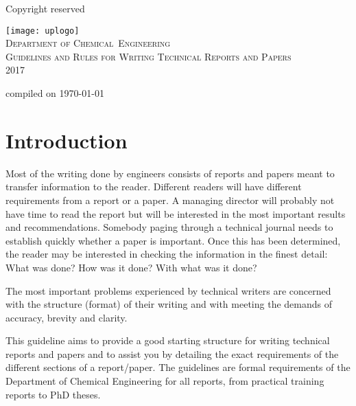 \documentclass[a5paper, 10pt]{article}
\begin{document}
\begin{titlepage}
  \begin{centering}
    \begin{flushright}Copyright reserved\end{flushright}
    \vfil
    \texttt{[image: uplogo]}\\
    \vfil
    {\Huge\scshape
    Department of Chemical~Engineering\\
    \vfil
    Guidelines and Rules for Writing Technical Reports and Papers\\}
  \vfil
  2017 \\
  \vfil
  \begin{flushright}\small{compiled on \today}\end{flushright}
\end{centering}

\end{titlepage}

\pagestyle{empty}

\cleardoublepage

\setcounter{page}{1}
\pagestyle{plain}
\tableofcontents
\newpage

\pagestyle{empty}
\cleardoublepage
\setcounter{page}{1}
\pagestyle{plain}

\section{Introduction}
\label{cha:introduction}
Most of the writing done by engineers consists of reports and papers
meant to transfer information to the reader.  Different readers will
have different requirements from a report or a paper.  A managing
director will probably not have time to read the report but will be
interested in the most important results and recommendations.
Somebody paging through a technical journal needs to establish quickly
whether a paper is important.  Once this has been determined, the
reader may be interested in checking the information in the finest
detail: 
What was done?  
How was it done?  
With what was it done?

The most important problems experienced by technical writers are
concerned with the structure (format) of their writing and with
meeting the demands of accuracy, brevity and clarity.

This guideline aims to provide a good starting structure for writing
technical reports and papers and to assist you by detailing the
exact requirements of the different sections of a report/paper. The
guidelines are formal requirements of the Department of Chemical
Engineering for all reports, from practical training reports to PhD
theses.
\end{document}
